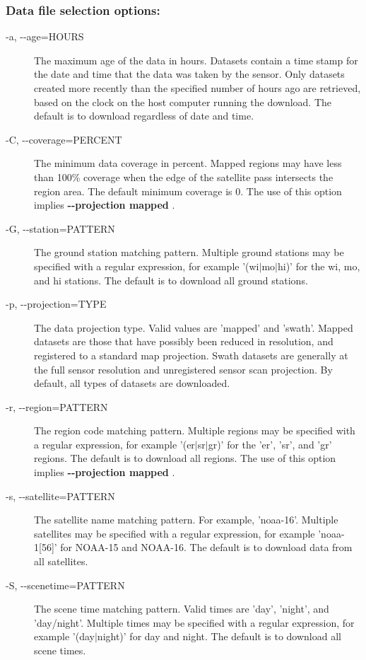 \subsubsection*{Data file selection options:}
\begin{description}
\item[ -a, -{-}age=HOURS ] The maximum age of the data in hours. Datasets contain a time stamp for the date and time that the data was taken by the sensor. Only datasets created more recently than the specified number of hours ago are retrieved, based on the clock on the host computer running the download. The default is to download regardless of date and time. 
\item[ -C, -{-}coverage=PERCENT ] The minimum data coverage in percent. Mapped regions may have less than 100\% coverage when the edge of the satellite pass intersects the region area. The default minimum coverage is 0. The use of this option implies \textbf{-{-}projection mapped}
.
\item[ -G, -{-}station=PATTERN ] The ground station matching pattern. Multiple ground stations may be specified with a regular expression, for example '(wi$|$mo$|$hi)' for the wi, mo, and hi stations. The default is to download all ground stations. 
\item[ -p, -{-}projection=TYPE ] The data projection type. Valid values are 'mapped' and 'swath'. Mapped datasets are those that have possibly been reduced in resolution, and registered to a standard map projection. Swath datasets are generally at the full sensor resolution and unregistered sensor scan projection. By default, all types of datasets are downloaded.
\item[ -r, -{-}region=PATTERN ] The region code matching pattern. Multiple regions may be specified with a regular expression, for example '(er$|$sr$|$gr)' for the 'er', 'sr', and 'gr' regions. The default is to download all regions. The use of this option implies \textbf{-{-}projection mapped}
.
\item[ -s, -{-}satellite=PATTERN ] The satellite name matching pattern. For example, 'noaa-16'. Multiple satellites may be specified with a regular expression, for example 'noaa-1[56]' for NOAA-15 and NOAA-16. The default is to download data from all satellites.
\item[ -S, -{-}scenetime=PATTERN ] The scene time matching pattern. Valid times are 'day', 'night', and 'day/night'. Multiple times may be specified with a regular expression, for example '(day$|$night)' for day and night. The default is to download all scene times.

\end{description}
